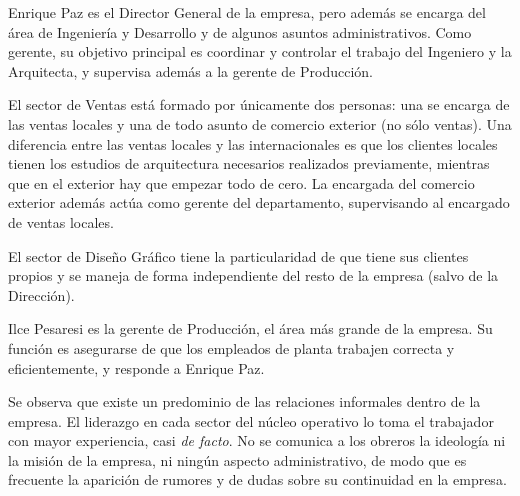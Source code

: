 \documentclass[a4paper,10pt,titlepage]{article}
\begin{document}
\begin{itemize}
Enrique Paz es el Director General de la empresa, pero adem\'as se encarga del \'area de Ingenier\'ia y Desarrollo y de algunos asuntos administrativos. Como gerente, su objetivo principal es coordinar y controlar el trabajo del Ingeniero y la Arquitecta, y supervisa adem\'as a la gerente de Producci\'on. 

El sector de Ventas est\'a formado por \'unicamente dos personas: una se encarga de las ventas locales y una de todo asunto de comercio exterior (no s\'olo ventas). Una diferencia entre las ventas locales y las internacionales es que los clientes locales tienen los estudios de arquitectura necesarios realizados previamente, mientras que en el exterior hay que empezar todo de cero. La encargada del comercio exterior además actúa como gerente del departamento, supervisando al encargado de ventas locales.

El sector de Dise\~no Gr\'afico tiene la particularidad de que tiene sus clientes propios y se maneja de forma independiente del resto de la empresa (salvo de la Direcci\'on).

Ilce Pesaresi es la gerente de Producci\'on, el \'area m\'as grande de la empresa. Su funci\'on es asegurarse de que los empleados de planta trabajen correcta y eficientemente, y responde a Enrique Paz. 

Se observa que existe un predominio de las relaciones informales dentro de la empresa. El liderazgo en cada sector del n\'ucleo operativo lo toma el trabajador con mayor experiencia, casi \textit{de facto}. No se comunica a los obreros la ideolog\'ia ni la misi\'on de la empresa, ni ning\'un aspecto administrativo, de modo que es frecuente la aparici\'on de rumores y de dudas sobre su continuidad en la empresa.
\end{itemize}
\end{document}
